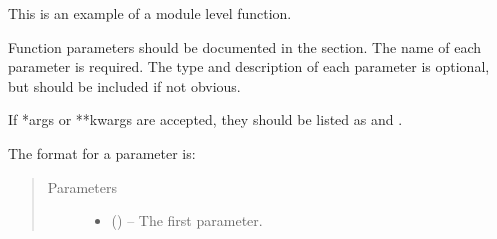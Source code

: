 \documentclass[letterpaper,10pt,english]{sphinxmanual}
\begin{document}
\begin{description}
\begin{fulllineitems}
\begin{quote}
\begin{description}
\begin{itemize}
\end{itemize}


\end{description}\end{quote}

\end{fulllineitems}


\begin{fulllineitems}
\label{\detokenize{autogen:example_docstring.module_level_function}}
This is an example of a module level function.

Function parameters should be documented in the  section.
The name of each parameter is required. The type and description of each
parameter is optional, but should be included if not obvious.

If *args or **kwargs are accepted,
they should be listed as  and .

The format for a parameter is:

\begin{sphinxVerbatim}[commandchars=\\\{\}]
  

           
              
       

         
\end{sphinxVerbatim}
\begin{quote}\begin{description}
\item[{Parameters}] \leavevmode\begin{itemize}
\item {} 
 () – The first parameter.


\end{itemize}
\end{description}
\end{quote}
\end{fulllineitems}
\end{description}
\end{document}
